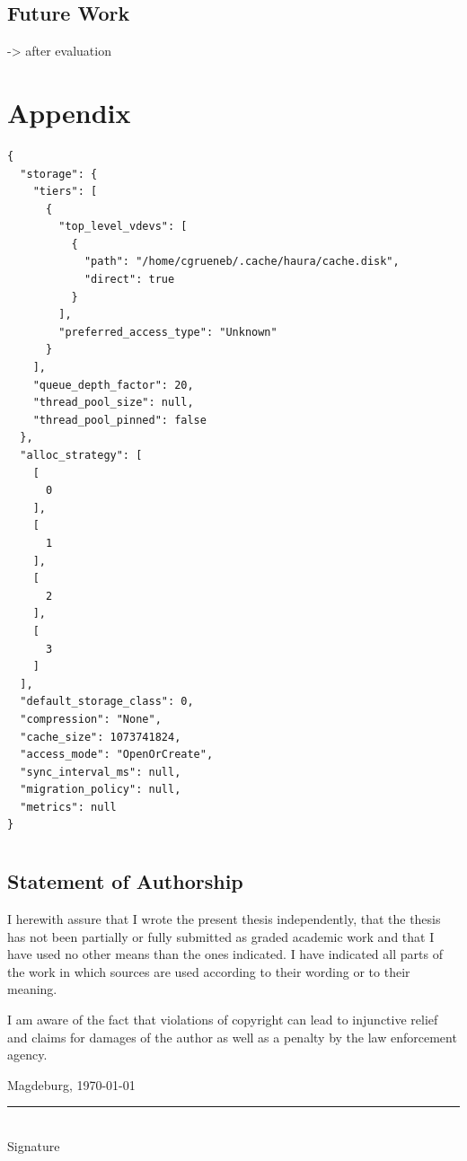 \documentclass[
	12pt,
	a4paper,
	abstract,
	bibliography=totoc,
	chapterprefix,
	headings=openright,
	numbers=endperiod,
	parskip=half,
	twoside,
]{scrreprt}
\begin{document}
\section{Future Work}

-> after evaluation








\appendix

\chapter{Appendix}
\label{cha:appendix}


\begin{lstlisting}[mathescape=true,caption=Haura configuration file for benchmark runs,label=lst:configuration haura]
{
  "storage": {
    "tiers": [
      {
        "top_level_vdevs": [
          {
            "path": "/home/cgrueneb/.cache/haura/cache.disk",
            "direct": true
          }
        ],
        "preferred_access_type": "Unknown"
      }
    ],
    "queue_depth_factor": 20,
    "thread_pool_size": null,
    "thread_pool_pinned": false
  },
  "alloc_strategy": [
    [
      0
    ],
    [
      1
    ],
    [
      2
    ],
    [
      3
    ]
  ],
  "default_storage_class": 0,
  "compression": "None",
  "cache_size": 1073741824,
  "access_mode": "OpenOrCreate",
  "sync_interval_ms": null,
  "migration_policy": null,
  "metrics": null
}

\end{lstlisting}




\chapter*{}

\section*{Statement of Authorship}

I herewith assure that I wrote the present thesis independently, that the thesis has not been partially or fully submitted as graded academic work and that I have used no other means than the ones indicated.
I have indicated all parts of the work in which sources are used according to their wording or to their meaning.

I am aware of the fact that violations of copyright can lead to injunctive relief and claims for damages of the author as well as a penalty by the law enforcement agency.

\bigskip

Magdeburg, \today

\bigskip
\bigskip

\rule{0.5\textwidth}{0.5pt}\\
\hspace*{0.25em}Signature
\end{document}
